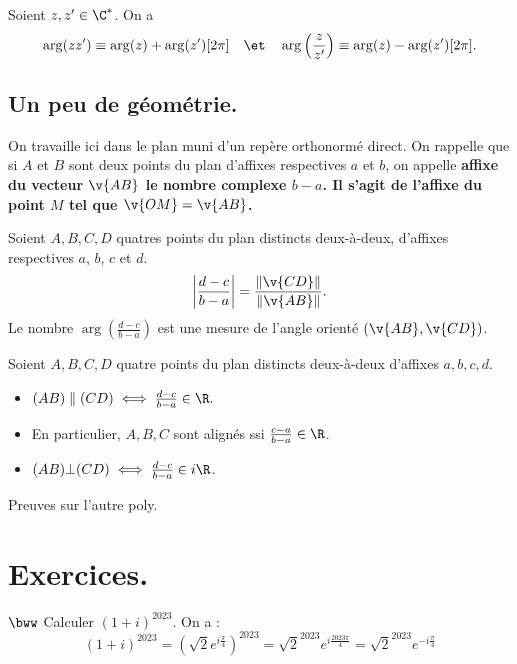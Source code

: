 \documentclass[11pt]{article}
\begin{document}
\begin{prop}{}{}
    Soient $z,z'\in\C^*$. On a
    \begin{equation*}
        \arg(zz')\equiv\arg(z)+\arg(z')[2\pi]\quad\et\quad\arg\left( \frac{z}{z'} \right)\equiv\arg(z)-\arg(z')[2\pi].
    \end{equation*}
\end{prop}

\subsection{Un peu de géométrie.}

\quad On travaille ici dans le plan muni d'un repère orthonormé direct. On rappelle que si $A$ et $B$ sont deux points du plan d'affixes respectives $a$ et $b$, on appelle \bf{affixe du vecteur} $\v{AB}$ le nombre complexe $b-a$. Il s'agit de l'affixe du point $M$ tel que $\v{OM}=\v{AB}$.

\begin{prop}{}{}
    Soient $A,B,C,D$ quatres points du plan distincts deux-à-deux, d'affixes respectives $a$, $b$, $c$ et $d$.
    \begin{equation*}
        \left|\frac{d-c}{b-a}\right|=\frac{\|\v{CD}\|}{\|\v{AB}\|}.
    \end{equation*}
    Le nombre $\arg\left( \frac{d-c}{b-a} \right)$ est une mesure de l'angle orienté $(\v{AB},\v{CD})$.
\end{prop}

\begin{corr}{}{}
    Soient $A,B,C,D$ quatre points du plan distincts deux-à-deux d'affixes $a,b,c,d$.
    \begin{itemize}
        \item $(AB)\parallel(CD)\iff\frac{d-c}{b-a}\in\R.$
        \item En particulier, $A,B,C$ sont alignés ssi $\frac{c-a}{b-a}\in\R$.
        \item $(AB)\bot(CD)\iff\frac{d-c}{b-a}\in i\R$.
    \end{itemize}
    \tcblower
    Preuves sur l'autre poly.
\end{corr}

\section{Exercices.}

\begin{exercice}{$\bww$}{}
    Calculer $(1 + i)^2023$.
    \tcblower
    On a :
    \begin{equation*}
        (1+i)^{2023}=(\sqrt{2}e^{i\frac{\pi}{4}})^{2023}
        = \sqrt{2}^{2023} e^{i\frac{2023\pi}{4}}
        = \sqrt{2}^{2023} e^{-i\frac{\pi}{4}}
    \end{equation*}
\end{exercice}
\end{document}
